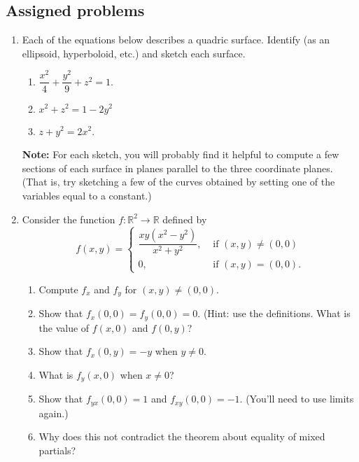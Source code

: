 \documentclass[letterpaper,12pt]{article}
\newcommand{\R}{\mathbb{R}}
\begin{document}
\subsection*{Assigned problems}
\begin{enumerate}
 \item Each of the equations below describes a quadric surface. Identify (as an ellipsoid, hyperboloid, etc.) and sketch each surface.
\begin{enumerate}
 \item $\dfrac{x^2}{4}+\dfrac{y^2}{9}+z^2=1$.
 \item $x^2+z^2=1-2y^2$
 \item $z+y^2=2x^2$.
\end{enumerate}
{\bf Note:} For each sketch, you will probably find it helpful to compute a few sections of each surface in planes parallel to the three coordinate planes. (That is, try sketching a few of the curves obtained by setting one of the variables equal to a constant.)

\item Consider the function $f:\R^2\to \R$ defined by
\[
 f(x,y) = \begin{cases}
           \dfrac{xy(x^2-y^2)}{x^2+y^2}, & \text{ if } (x,y)\neq (0,0)\\ 0, & \text{ if } (x,y)=(0,0).
          \end{cases}
\]
\begin{enumerate}
 \item Compute $f_x$ and $f_y$ for $(x,y)\neq (0,0)$.
 \item Show that $f_x(0,0)=f_y(0,0)=0$. (Hint: use the definitions. What is the value of $f(x,0)$ and $f(0,y)$?
 \item Show that $f_x(0,y)=-y$ when $y\neq 0$.
 \item What is $f_y(x,0)$ when $x\neq 0$?
 \item Show that $f_{yx}(0,0)=1$ and $f_{xy}(0,0)=-1$. (You'll need to use limits again.)
 \item Why does this not contradict the theorem about equality of mixed partials?
\end{enumerate}

 \end{enumerate}
\end{document}
